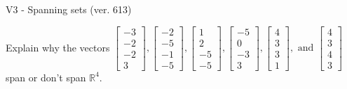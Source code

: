 \begin{exercise}
  \begin{exerciseTitle}V3 - Spanning sets (ver. 613)\end{exerciseTitle}
  \begin{exerciseStatement}
    Explain why the vectors \(\left[\begin{array}{r}
-3 \\
-2 \\
-2 \\
3
\end{array}\right] , \left[\begin{array}{r}
-2 \\
-5 \\
-1 \\
-5
\end{array}\right] , \left[\begin{array}{r}
1 \\
2 \\
-5 \\
-5
\end{array}\right] , \left[\begin{array}{r}
-5 \\
0 \\
-3 \\
3
\end{array}\right] , \left[\begin{array}{r}
4 \\
3 \\
3 \\
1
\end{array}\right] , \text{ and } \left[\begin{array}{r}
4 \\
3 \\
4 \\
3
\end{array}\right]\) span or don't span \(\mathbb{R}^4\). 
	



\end{exerciseStatement}
\end{exercise}
